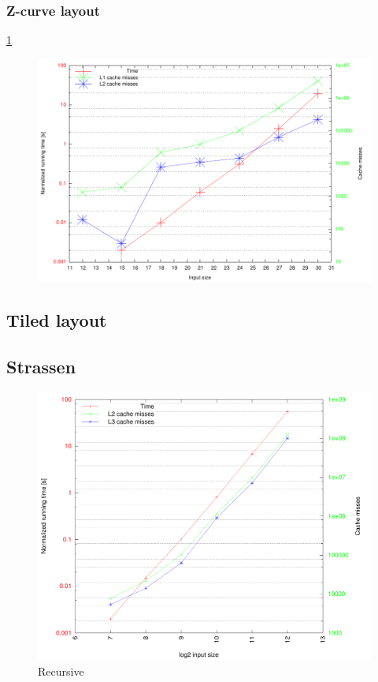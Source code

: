 \subsubsection{Z-curve layout}

\ref{fig:zrzrzr0}

\begin{figure}[h!]
  \centering
  \includegraphics[width=\textwidth]{zrzrzr0.pdf}
  \label{fig:zrzrzr0}
\end{figure}

\subsection{Tiled layout}

\subsection{Strassen}


\begin{figure}[h!]
  \centering
  \includegraphics[width=\textwidth]{"../project2/plots/4096/row-tiled8x8 recursive-8(tiled-bc)_column-tiled-8x8 recursive-8(generic-bc)_row-tiled8x8 recursive-8(tiled-bc)_0"}
  \caption{Recursive}
\end{figure}




